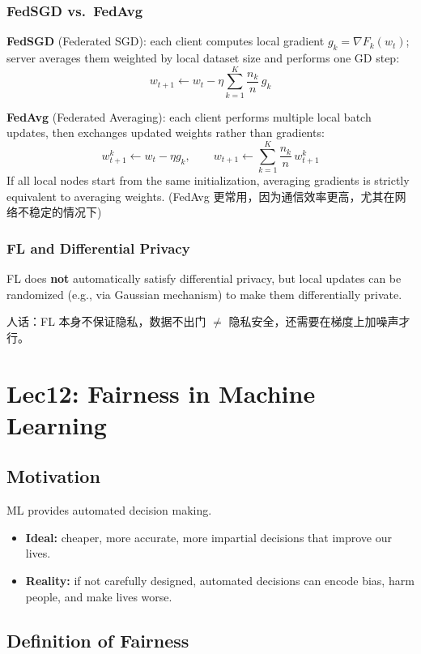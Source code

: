 \documentclass[UTF8]{ctexart}
\begin{document}
\subsubsection{FedSGD vs.\ FedAvg}

\textbf{FedSGD} (Federated SGD): each client computes local gradient $g_k = \nabla F_k(w_t)$; server averages them weighted by local dataset size and performs one GD step:
\[
    w_{t+1} \leftarrow w_t - \eta \sum_{k=1}^{K} \frac{n_k}{n}\, g_k
\]

\textbf{FedAvg} (Federated Averaging): each client performs multiple local batch updates, then exchanges updated weights rather than gradients:
\[
    w_{t+1}^k \leftarrow w_t - \eta g_k, \qquad
    w_{t+1} \leftarrow \sum_{k=1}^{K} \frac{n_k}{n}\, w_{t+1}^k
\]
If all local nodes start from the same initialization, averaging gradients is strictly equivalent to averaging weights.
(FedAvg 更常用，因为通信效率更高，尤其在网络不稳定的情况下)
\subsubsection{FL and Differential Privacy}
FL does \textbf{not} automatically satisfy differential privacy, but local updates can be randomized (e.g., via Gaussian mechanism) to make them differentially private.

人话：FL 本身不保证隐私，数据不出门 $\neq$ 隐私安全，还需要在梯度上加噪声才行。


\section{Lec12: Fairness in Machine Learning}
\subsection{Motivation}

ML provides automated decision making.
\begin{itemize}
    \item \textbf{Ideal:} cheaper, more accurate, more impartial decisions that improve our lives.
    \item \textbf{Reality:} if not carefully designed, automated decisions can encode bias, harm people, and make lives worse.
\end{itemize}

\subsection{Definition of Fairness}
\end{document}

